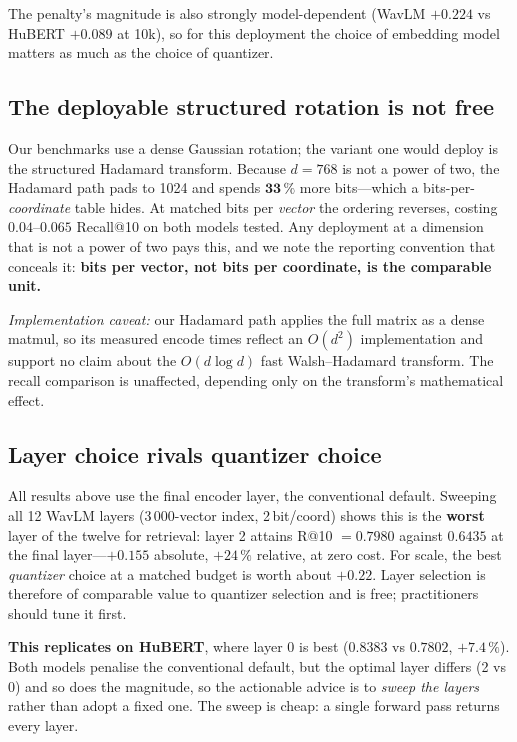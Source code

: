 \documentclass[conference]{IEEEtran}
\begin{document}
The penalty's magnitude is also strongly model-dependent (WavLM $+0.224$ vs HuBERT $+0.089$ at
10k), so for this deployment the choice of embedding model matters as much as the choice of
quantizer.

\subsection{The deployable structured rotation is not free}

Our benchmarks use a dense Gaussian rotation; the variant one would deploy is the structured
Hadamard transform. Because $d = 768$ is not a power of two, the Hadamard path pads to 1024 and
spends $\mathbf{33\,\%}$ more bits---which a bits-per-\emph{coordinate} table hides. At matched
bits per \emph{vector} the ordering reverses, costing $0.04$--$0.065$ Recall@10 on both models
tested. Any deployment at a dimension that is not a power of two pays this, and we note the
reporting convention that conceals it: \textbf{bits per vector, not bits per coordinate, is the
comparable unit.}

\emph{Implementation caveat:} our Hadamard path applies the full matrix as a dense matmul, so its
measured encode times reflect an $O(d^2)$ implementation and support no claim about the
$O(d \log d)$ fast Walsh--Hadamard transform. The recall comparison is unaffected, depending only
on the transform's mathematical effect.

\subsection{Layer choice rivals quantizer choice}
\label{sec:layers}

All results above use the final encoder layer, the conventional default. Sweeping all 12 WavLM
layers (3\,000-vector index, 2\,bit/coord) shows this is the \textbf{worst} layer of the twelve for
retrieval: layer 2 attains R@10 $= 0.7980$ against $0.6435$ at the final layer---$\mathbf{+0.155}$
absolute, $+24\,\%$ relative, at zero cost. For scale, the best \emph{quantizer} choice at a
matched budget is worth about $+0.22$. Layer selection is therefore of comparable value to
quantizer selection and is free; practitioners should tune it first.

\textbf{This replicates on HuBERT}, where layer 0 is best ($0.8383$ vs $0.7802$, $+7.4\,\%$). Both
models penalise the conventional default, but the optimal layer differs (2 vs 0) and so does the
magnitude, so the actionable advice is to \emph{sweep the layers} rather than adopt a fixed one.
The sweep is cheap: a single forward pass returns every layer.
\end{document}
